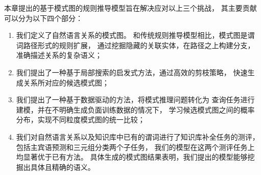本章提出的基于模式图的规则推导模型旨在解决应对以上三个挑战，
其主要贡献可以分为以下四个部分：
\begin{enumerate}
\item{我们定义了自然语言关系的模式图。
和传统规则推导模型相比，模式图是谓词路径形式的规则扩展，
通过挖掘隐藏的关联实体，在路径之上构建分支，
准确描述关系的复杂语义；}
\item{我们提出了一种基于局部搜索的启发式方法，通过高效的剪枝策略，
快速生成关系所对应的候选模式图；}
\item{我们提出了一种基于数据驱动的方法，将模式推理问题转化为
查询任务进行建模，并在不明确生成负面训练数据的情况下，
学习候选模式图之间的概率分布，实现不同粒度模式图的统一比较；}
\item{我们对自然语言关系以及知识库中已有的谓词进行了知识库补全任务的测评，
包括主宾语预测和三元组分类两个子任务，
我们的模型在这两个测评任务上均显著优于已有方法。
具体生成的模式图结果表明，我们提出的模型能够挖掘出具体且精确的语义。}
\end{enumerate}



